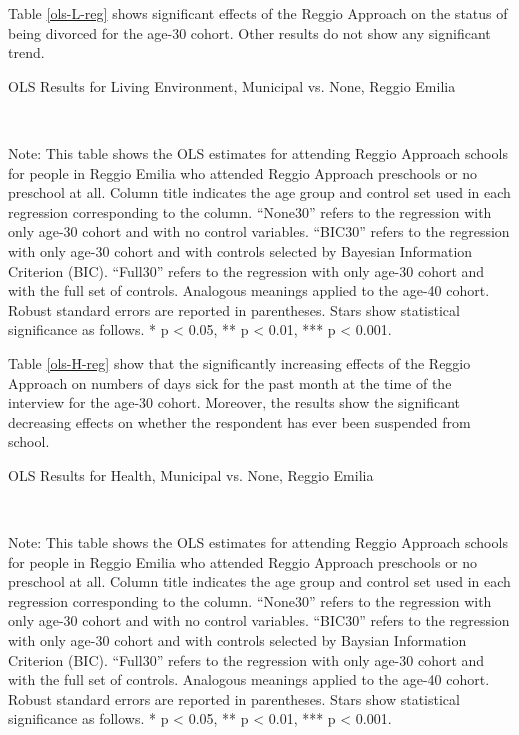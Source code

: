 Table \ref{ols-L-reg} shows significant effects of the Reggio Approach on the status of being divorced for the age-30 cohort. Other results do not show any significant trend. 

\begin{table}[H] \caption{OLS Results for Living Environment, Municipal vs. None, Reggio Emilia} \label{ols-L-reg}

\vspace{1ex} \\
\footnotesize\raggedright{Note: This table shows the OLS estimates for attending Reggio Approach schools for people in Reggio Emilia who attended Reggio Approach preschools or no preschool at all. Column title indicates the age group and control set used in each regression corresponding to the column. ``None30'' refers to the regression with only age-30 cohort and with no control variables. ``BIC30'' refers to the regression with only age-30 cohort and with controls selected by Bayesian Information Criterion (BIC). ``Full30'' refers to the regression with only age-30 cohort and with the full set of controls. Analogous meanings applied to the age-40 cohort. Robust standard errors are reported in parentheses. Stars show statistical significance as follows. * p < 0.05, ** p < 0.01, *** p < 0.001.}
\end{table}

Table \ref{ols-H-reg} show that the significantly increasing effects of the Reggio Approach on numbers of days sick for the past month at the time of the interview for the age-30 cohort. Moreover, the results show the significant decreasing effects on whether the respondent has ever been suspended from school. 

\begin{table}[H] \caption{OLS Results for Health, Municipal vs. None, Reggio Emilia} \label{ols-H-reg}

\vspace{1ex} \\
\footnotesize\raggedright{Note: This table shows the OLS estimates for attending Reggio Approach schools for people in Reggio Emilia who attended Reggio Approach preschools or no preschool at all. Column title indicates the age group and control set used in each regression corresponding to the column. ``None30'' refers to the regression with only age-30 cohort and with no control variables. ``BIC30'' refers to the regression with only age-30 cohort and with controls selected by Baysian Information Criterion (BIC). ``Full30'' refers to the regression with only age-30 cohort and with the full set of controls. Analogous meanings applied to the age-40 cohort. Robust standard errors are reported in parentheses. Stars show statistical significance as follows. * p < 0.05, ** p < 0.01, *** p < 0.001.}
\end{table}

